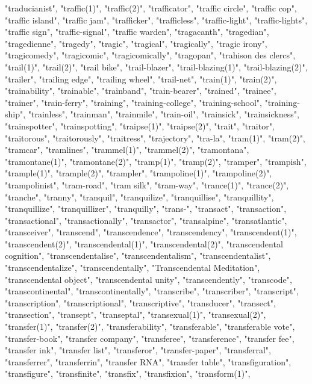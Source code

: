 "traducianist",
"traffic(1)",
"traffic(2)",
"trafficator",
"traffic circle",
"traffic cop",
"traffic island",
"traffic jam",
"trafficker",
"trafficless",
"traffic-light",
"traffic-lights",
"traffic sign",
"traffic-signal",
"traffic warden",
"tragacanth",
"tragedian",
"tragedienne",
"tragedy",
"tragic",
"tragical",
"tragically",
"tragic irony",
"tragicomedy",
"tragicomic",
"tragicomically",
"tragopan",
"trahison des clercs",
"trail(1)",
"trail(2)",
"trail bike",
"trail-blazer",
"trail-blazing(1)",
"trail-blazing(2)",
"trailer",
"trailing edge",
"trailing wheel",
"trail-net",
"train(1)",
"train(2)",
"trainability",
"trainable",
"trainband",
"train-bearer",
"trained",
"trainee",
"trainer",
"train-ferry",
"training",
"training-college",
"training-school",
"training-ship",
"trainless",
"trainman",
"trainmile",
"train-oil",
"trainsick",
"trainsickness",
"trainspotter",
"trainspotting",
"traipse(1)",
"traipse(2)",
"trait",
"traitor",
"traitorous",
"traitorously",
"traitress",
"trajectory",
"tra-la",
"tram(1)",
"tram(2)",
"tramcar",
"tramlines",
"trammel(1)",
"trammel(2)",
"tramontana",
"tramontane(1)",
"tramontane(2)",
"tramp(1)",
"tramp(2)",
"tramper",
"trampish",
"trample(1)",
"trample(2)",
"trampler",
"trampoline(1)",
"trampoline(2)",
"trampolinist",
"tram-road",
"tram silk",
"tram-way",
"trance(1)",
"trance(2)",
"tranche",
"tranny",
"tranquil",
"tranquilize",
"tranquillise",
"tranquillity",
"tranquillize",
"tranquillizer",
"tranquilly",
"trans-",
"transact",
"transaction",
"transactional",
"transactionally",
"transactor",
"transalpine",
"transatlantic",
"transceiver",
"transcend",
"transcendence",
"transcendency",
"transcendent(1)",
"transcendent(2)",
"transcendental(1)",
"transcendental(2)",
"transcendental cognition",
"transcendentalise",
"transcendentalism",
"transcendentalist",
"transcendentalize",
"transcendentally",
"Transcendental Meditation",
"transcendental object",
"transcendental unity",
"transcendently",
"transcode",
"transcontinental",
"transcontinentally",
"transcribe",
"transcriber",
"transcript",
"transcription",
"transcriptional",
"transcriptive",
"transducer",
"transect",
"transection",
"transept",
"transeptal",
"transexual(1)",
"transexual(2)",
"transfer(1)",
"transfer(2)",
"transferability",
"transferable",
"transferable vote",
"transfer-book",
"transfer company",
"transferee",
"transference",
"transfer fee",
"transfer ink",
"transfer list",
"transferor",
"transfer-paper",
"transferral",
"transferrer",
"transferrin",
"transfer RNA",
"transfer table",
"transfiguration",
"transfigure",
"transfinite",
"transfix",
"transfixion",
"transform(1)",
